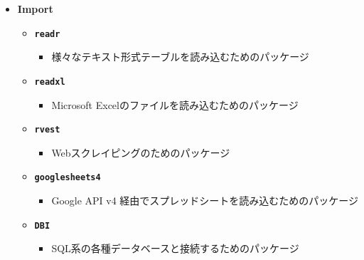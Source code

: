\documentclass[
  12pt,
]{book}
\providecommand{\tightlist}{%
  \setlength{\itemsep}{0pt}\setlength{\parskip}{0pt}}
\begin{document}
\begin{itemize}
\tightlist
\item
  \textbf{Import}

  \begin{itemize}
  \tightlist
  \item
    \textbf{\texttt{readr}} \citep{R-readr}

    \begin{itemize}
    \tightlist
    \item
      様々なテキスト形式テーブルを読み込むためのパッケージ
    \end{itemize}
  \item
    \textbf{\texttt{readxl}} \citep{R-readxl}

    \begin{itemize}
    \tightlist
    \item
      Microsoft Excelのファイルを読み込むためのパッケージ
    \end{itemize}
  \item
    \textbf{\texttt{rvest}} \citep{R-rvest}

    \begin{itemize}
    \tightlist
    \item
      Webスクレイピングのためのパッケージ
    \end{itemize}
  \item
    \textbf{\texttt{googlesheets4}} \citep{R-googlesheets4}

    \begin{itemize}
    \tightlist
    \item
      Google API v4 経由でスプレッドシートを読み込むためのパッケージ
    \end{itemize}
  \item
    \textbf{\texttt{DBI}} \citep{R-DBI}

    \begin{itemize}
    \tightlist
    \item
      SQL系の各種データベースと接続するためのパッケージ
    \end{itemize}
  \end{itemize}
\end{itemize}

\newpage
\end{document}

